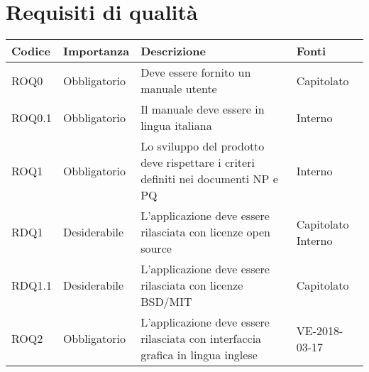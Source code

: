 \documentclass[../AnalisideiRequisiti.tex]{subfiles}
\begin{document}
	\section{Requisiti di qualità}
			\begin{longtable}{| p{2cm} | p{2.5cm} |p{5cm} | p{2.5cm} |}
			\hline
			\textbf{Codice} & \textbf{Importanza} & \textbf{Descrizione} & \textbf{Fonti}\\
			\hline
			\endhead
							
			\newline ROQ0&\newline Obbligatorio&
			\newline Deve essere fornito un manuale utente&
			\newline Capitolato
			\\[1em]
			\hline
			\newline ROQ0.1&\newline Obbligatorio&
			\newline Il manuale deve essere in lingua italiana&
			\newline Interno
			\\[1em]
			\hline
			\newline ROQ1&\newline Obbligatorio&
			\newline Lo sviluppo del prodotto deve rispettare i criteri definiti nei documenti NP e PQ&
			\newline Interno
			\\[1em]
			\hline
			\newline
			RDQ1&\newline Desiderabile&
			\newline 
			L'applicazione deve essere rilasciata con licenze open source&
			\newline Capitolato \newline Interno
			\\[1em]
			\hline	
			\newline
			RDQ1.1&\newline Desiderabile&
			\newline 
			L'applicazione deve essere rilasciata con licenze BSD/MIT &
			\newline Capitolato
			\\[1em]
			\hline	
			\newline
			ROQ2&\newline Obbligatorio&
			\newline 
			L'applicazione deve essere rilasciata con interfaccia grafica in lingua inglese&
			\newline VE-2018-03-17

\end{longtable}
\end{document}

